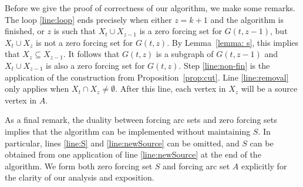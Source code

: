 \documentclass[12pt]{amsart}
\theoremstyle{plain}
\theoremstyle{definition}
\renewcommand{\subset}{\subseteq}
\begin{document}
Before we give the proof of correctness of our algorithm, we make some remarks. 
The loop \ref{line:loop} ends precisely when either $z=k+1$ and the algorithm is finished, or $z$ is such that $X_t\cup X_{z-1}$ is a zero forcing set for $G(t,z-1)$, but $X_t\cup X_z$ is not a zero forcing set for $G(t,z)$. By Lemma~\ref{lemma: s}, this implies that $X_{z}\subset X_{z-1}.$ 
It follows that $G(t,z)$ is a subgraph of $G(t,z-1)$ and $X_t\cup X_{z-1}$ is also a zero forcing set for $G(t,z)$. Step \ref{line:non-fin} is the application of the construction from Proposition~\ref{prop:cut}. 
Line \ref{line:removal} only applies when $X_t\cap X_{z}\neq \emptyset$. After this line, each vertex in $X_{z}$ will be a source vertex in $A$.

As a final remark, the duality between forcing arc sets and zero forcing sets implies that the algorithm can be implemented without maintaining $S$. In particular, lines \ref{line:S} and \ref{line:newSource} can be omitted, and $S$ can be obtained from one application of line \ref{line:newSource} at the end of the algorithm. We form both zero forcing set $S$ and forcing arc set $A$ explicitly for the clarity of our analysis and exposition. 
\end{document}
